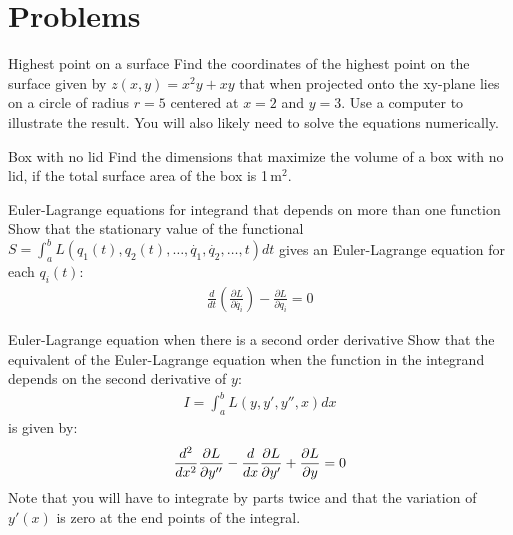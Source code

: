 
\section{Problems}
\begin{problem}{Highest point on a surface} Find the coordinates of the highest point on the surface given by $z(x,y)=x^2y+xy$ that when projected onto the xy-plane lies on a circle of radius $r=5$ centered at $x=2$ and $y=3$. Use a computer to illustrate the result. You will also likely need to solve the equations numerically.
\label{prob_CalcVar_1}
\end{problem}
\begin{problem}{Box with no lid} Find the dimensions that maximize the volume of a box with no lid, if the total surface area of the box is 1\,m$^2$.
\label{prob_CalcVar_2}
\end{problem}
%
%
%

\begin{problem}{Euler-Lagrange equations for integrand that depends on more than one function}\label{prob_CalcVar_3} Show that the stationary value of the functional $S=\int_a^b L(q_1(t),q_2(t),\dots,\dot{q_1}, \dot{q_2},\dots,t)dt$ gives an Euler-Lagrange equation for each $q_i(t)$:
\begin{align*}
\frac{d}{dt}\left(\frac{\partial L}{\partial \dot{q_i}}\right)-\frac{\partial L}{\partial q_i}=0
\end{align*}
\end{problem}

\begin{problem}{Euler-Lagrange equation when there is a second order derivative}\label{prob_CalcVar_4} Show that the equivalent of the Euler-Lagrange equation when the function in the integrand depends on the second derivative of $y$:
\begin{align*}
I=\int_a^b L(y,y',y'',x)dx
\end{align*}
is given by:
\begin{align*}
\frac{d^2}{dx^2}\frac{\partial L}{\partial y''}-\frac{d}{dx}\frac{\partial L}{\partial y'}+\frac{\partial L}{\partial y}=0
\end{align*}
Note that you will have to integrate by parts twice and that the variation of $y'(x)$ is zero at the end points of the integral.
\end{problem}

